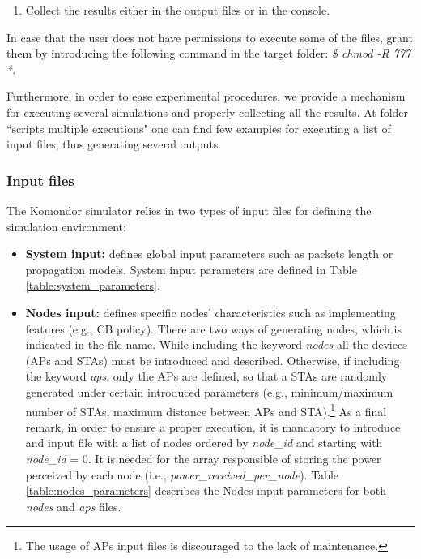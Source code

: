 \documentclass[a4paper]{article}
\begin{document}
\begin{enumerate}
\begin{itemize}
		            \item \textit{arg\_6} (FLAG\_PRINT\_SYSTEM\_LOGS): flag to indicate whether to print the system logs (1) or not (0).
		            \item \textit{arg\_7} (FLAG\_PRINT\_NODE\_LOGS): flag to indicate whether to print the nodes logs (1) or not (0).
		            \item \textit{arg\_8} (SIM\_TIME): simulation time in seconds.
		            \item \textit{arg\_8} (SEED): random seed for the experiments.
				\end{itemize}
		    \item Collect the results either in the output files or in the console.
		\end{enumerate}
	
		In case that the user does not have permissions to execute some of the files, grant them by introducing the following command in the target folder: \emph{\$ chmod -R 777 *}.
		
		Furthermore, in order to ease experimental procedures, we provide a mechanism for executing several simulations and properly collecting all the results. At folder ``scripts multiple executions" one can find few examples for executing a list of input files, thus generating several outputs.		
		
		\subsubsection{Input files}
		\label{section:input_files}	
		The Komondor simulator relies in two types of input files for defining the simulation environment:
		\begin{itemize}
			\item \textbf{System input:} defines global input parameters such as packets length or propagation models. System input parameters are defined in Table \ref{table:system_parameters}.
			\item \textbf{Nodes input:} defines specific nodes' characteristics such as implementing features (e.g., CB policy). There are two ways of generating nodes, which is indicated in the file name. While including the keyword \emph{nodes} all the devices (APs and STAs) must be introduced and described. Otherwise, if including the keyword \emph{aps}, only the APs are defined, so that a STAs are randomly generated under certain introduced parameters (e.g., minimum/maximum number of STAs, maximum distance between APs and STA).\footnote{The usage of APs input files is discouraged to the lack of maintenance.} As a final remark, in order to ensure a proper execution, it is mandatory to introduce and input file with a list of nodes ordered by \textit{node\_id} and starting with \textit{node\_id} = 0. It is needed for the array responsible of storing the power perceived by each node (i.e., \textit{power\_received\_per\_node}). Table \ref{table:nodes_parameters} describes the Nodes input parameters for both \emph{nodes} and \emph{aps} files.
		\end{itemize}		
\end{document}
